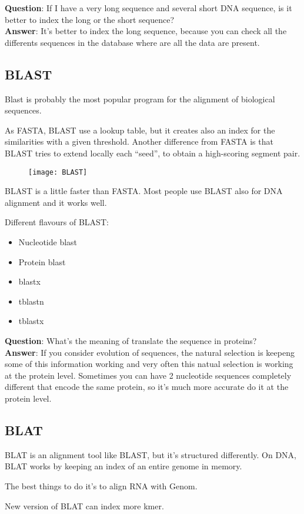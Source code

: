 \textbf{Question}: If I have a very long sequence and several short DNA
sequence, is it better to index the long or the short sequence? \\

\textbf{Answer}: It's better to index the long sequence, because you can
check all the differents sequences in the database where are all the data are
present.

\subsection{BLAST}

Blast is probably the most popular program for the alignment of biological
sequences.

As FASTA, BLAST use a lookup table, but it creates also an index for the
similarities with a given threshold. Another difference from FASTA is that
BLAST tries to extend locally each ``seed'', to obtain a high-scoring segment
pair.

\begin{figure}[H]
  \centering
  \texttt{[image: BLAST]}
  \label{fig:blast}
\end{figure}

BLAST is a little faster than FASTA. Most people use BLAST also for DNA
alignment and it works well.

Different flavours of BLAST:
\begin{itemize}
  \item Nucleotide blast
  \item Protein blast
  \item blastx
  \item tblastn
  \item tblastx
\end{itemize}

\textbf{Question}: What's the meaning of translate the sequence in proteins? \\

\textbf{Answer}: If you consider evolution of sequences, the natural selection
is keepeng some of this information working and very often this natual
selection is working at the protein level.
Sometimes you can have 2 nucleotide sequences completely different that
encode the same protein, so it's much more accurate do it at the protein level.

\subsection{BLAT}

BLAT is an alignment tool like BLAST, but it's structured differently. On DNA,
BLAT works by keeping an index of an entire genome in memory.

The best things to do it's to align RNA with Genom.

New version of BLAT can index more kmer.
